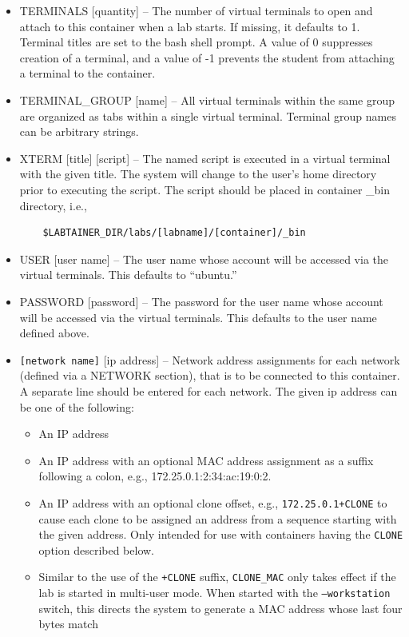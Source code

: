 \documentclass[12pt]{article}
\begin{document}
\begin{itemize}
\begin{itemize}
\item TERMINALS [quantity] -- The number of virtual terminals to open and attach to this 
container when a lab starts.  If missing, it defaults to 1. Terminal titles are set to the 
bash shell prompt. A value of 0 suppresses creation of a terminal, and a value of -1 prevents
the student from attaching a terminal to the container. 
\item TERMINAL\_GROUP [name] -- All virtual terminals within the same group are organized as
tabs within a single virtual terminal.  Terminal group names can be arbitrary strings.
\item XTERM [title] [script] -- The named script is executed in a virtual terminal with the
given title.   The system will change to the user's home directory prior to executing the
script.  The script should be placed in container \_bin directory, i.e.,
\begin{verbatim}
    $LABTAINER_DIR/labs/[labname]/[container]/_bin
\end{verbatim}
\item USER [user name] -- The user name whose account will be accessed via the virtual terminals. 
This defaults to ``ubuntu.''
\item PASSWORD [password] -- The password for the user name whose account will be accessed via the virtual terminals. 
This defaults to the user name defined above.
\item \verb![network name]! [ip address] -- Network address assignments for each network (defined via a NETWORK section), 
that is to be connected to this container.  A separate line should be entered for each network.  The given ip address 
can be one of the following:
\begin{itemize}
\item An IP address 
\item An IP address with an optional MAC address assignment as a suffix following a colon, e.g., 172.25.0.1:2:34:ac:19:0:2.
\item An IP address with an optional clone offset, e.g., {\tt 172.25.0.1+CLONE} to cause each clone to be assigned an address
from a sequence starting with the given address.  Only intended for use with containers having the {\tt CLONE} option described below.
\item Similar to the use of the {\tt +CLONE} suffix, {\tt CLONE\_MAC} only takes effect if the lab is started in multi-user mode.  
When started with the {\tt --workstation} switch, this directs the system to generate a MAC address whose last four bytes match 

\end{itemize}
\end{itemize}
\end{itemize}
\end{document}
